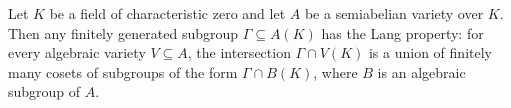 Let $K$ be a field of characteristic zero and let $A$ be a semiabelian variety over $K$. Then any finitely generated subgroup $\Gamma \subseteq A(K)$ has the Lang property: for every algebraic variety $V \subseteq A$, the intersection $\Gamma \cap V(K)$ is a union of finitely many cosets of subgroups of the form $\Gamma \cap B(K)$, where $B$ is an algebraic subgroup of $A$.
